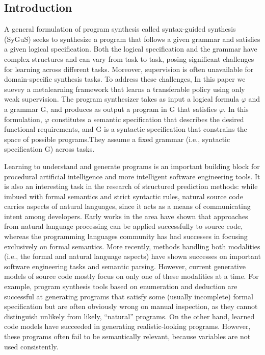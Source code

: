 \documentclass{article}
\begin{document}
\subsection{Introduction}
A general formulation of program synthesis called syntax-guided synthesis (SyGuS) seeks to synthesize a program that follows a given grammar and satisfies a given logical specification. Both the logical specification and the grammar have complex structures and can vary from task to task, posing significant challenges for learning across different tasks. Moreover, supervision is often unavailable for domain-specific synthesis tasks. To address these challenges, In this paper we suevey a metalearning framework that learns a transferable policy using only weak supervision. The program synthesizer takes as input a logical formula $\varphi$ and a grammar G, and produces as output a program in G that satisfies $\varphi$. In this formulation, $\varphi$ constitutes a semantic specification that describes the desired functional requirements, and G is a syntactic specification that constrains the space of possible programs.They assume a fixed grammar (i.e., syntactic specification G) across tasks.

Learning to understand and generate programs is an important building block for procedural artificial intelligence and more intelligent software engineering tools. It is also an interesting task in the research of structured prediction methods: while imbued with formal semantics and strict syntactic rules, natural source code carries aspects of natural languages, since it acts as a means of communicating intent among developers. Early works in the area have shown that approaches from natural language processing can be applied successfully to source code, whereas the programming languages community has had successes in focusing exclusively on formal semantics. More recently, methods handling both modalities (i.e., the formal and natural language aspects) have shown successes on important software engineering tasks and semantic parsing. However, current generative models of source code mostly focus on only one of these modalities at a time. For example, program synthesis tools based on enumeration and deduction are successful at generating programs that satisfy some (usually incomplete) formal specification but are often obviously wrong on manual inspection, as they cannot distinguish unlikely from likely, “natural” programs. On the other hand, learned code models have succeeded in generating realistic-looking programs. However, these programs often fail to be semantically relevant, because variables are not used consistently.
\end{document}

